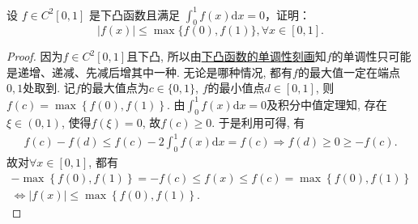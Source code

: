 \documentclass[../../main.tex]{subfiles}
\begin{document}
\begin{example}
设 \( f \in C^2[0, 1] \) 是下凸函数且满足 \( \int_0^1 f(x)\mathrm{d}x = 0 \)，证明：
\[ |f(x)| \leqslant \max\{f(0), f(1)\}, \forall x \in [0, 1]. \]
\end{example}
\begin{proof}
因为$f\in C^2\left[ 0,1 \right]$且下凸, 所以由\hyperref[proposition:下凸函数的单调性刻画]{下凸函数的单调性刻画}知$f$的单调性只可能是递增、递减、先减后增其中一种. 无论是哪种情况, 都有$f$的最大值一定在端点$0,1$处取到.
记$f$的最大值点为$c\in \{ 0,1 \}$, $f$的最小值点$d\in [0,1]$, 则$f\left( c \right) =\max \left\{ f\left( 0 \right) ,f\left( 1 \right) \right\}$.
由$\int_0^1{f\left( x \right) \mathrm{d}x}=0$及积分中值定理知, 存在$\xi \in (0,1)$, 使得$f\left( \xi \right) =0$, 故$f\left( c \right) \geqslant 0$. 于是利用可得, 有
\begin{align*}
f\left( c \right) -f\left( d \right) \leqslant f\left( c \right) -2\int_0^1{f\left( x \right) \mathrm{d}x}=f\left( c \right) \Longrightarrow f\left( d \right) \geqslant 0\geqslant -f\left( c \right) .
\end{align*}
故对$\forall x\in [0,1]$, 都有
\begin{gather*}
-\max \left\{ f\left( 0 \right) ,f\left( 1 \right) \right\} =-f\left( c \right) \leqslant f\left( x \right) \leqslant f\left( c \right) =\max \left\{ f\left( 0 \right) ,f\left( 1 \right) \right\} \\
\Longleftrightarrow \left| f\left( x \right) \right|\leqslant \max \left\{ f\left( 0 \right) ,f\left( 1 \right) \right\} .
\end{gather*}

\end{proof}
\end{document}
